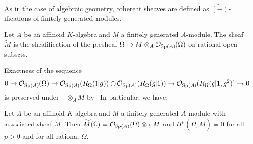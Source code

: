 As in the case of algebraic geometry, coherent sheaves are defined as $\widetilde{(-)}$-ifications of finitely generated modules. 
\begin{definition}[$\widetilde{(-)}$]\label{def: tildeification}
    Let $A$ be an affinoid $K$-algebra and $M$ a finitely generated $A$-module. The sheaf $\widetilde{M}$ is the sheafification of the presheaf $\Omega\mapsto M\otimes_{A}\mathcal{O}_{\mathrm{Sp}(A)}(\Omega)$ on rational open subsets. 
\end{definition}
Exactness of the sequence 
$$0\to\mathcal{O}_{\mathrm{Sp}(A)}(\Omega)\to\mathcal{O}_{\mathrm{Sp}(A)}(R_{\Omega}(1|g))\oplus\mathcal{O}_{\mathrm{Sp}(A)}(R_{\Omega}(g|1))\to\mathcal{O}_{\mathrm{Sp}(A)}(R_{\Omega}(g|1,g^{2}))\to0$$
is preserved under $-\otimes_{A}M$ by . In particular, we have:
\begin{proposition}\label{prop: tildeification is tensor}
    Let $A$ be an affinoid $K$-algebra and $M$ a finitely generated $A$-module with associated sheaf $\widetilde{M}$. Then $\widetilde{M}(\Omega)=\mathcal{O}_{\mathrm{Sp}(A)}(\Omega)\otimes_{A}M$ and $H^{p}(\Omega,\widetilde{M})=0$ for all $p>0$ and for all rational $\Omega$. 
\end{proposition}